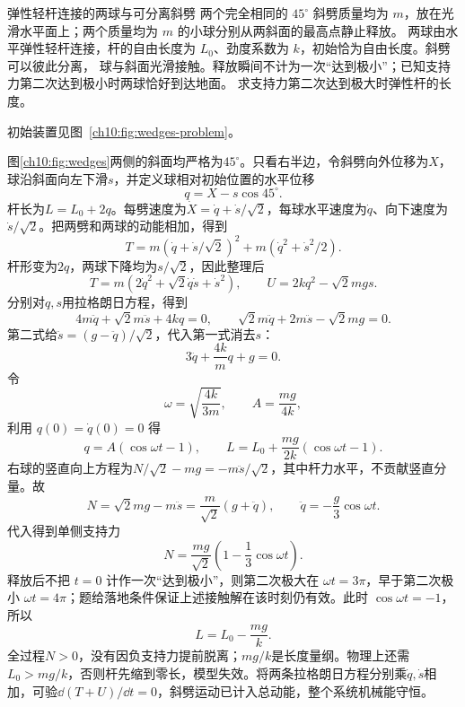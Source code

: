\begin{origexamplebox}{弹性轻杆连接的两球与可分离斜劈}\label{ch10:ex:wedges}
两个完全相同的 $45^\circ$ 斜劈质量均为 $m$，放在光滑水平面上；两个质量均为 $m$ 的小球分别从两斜面的最高点静止释放。
两球由水平弹性轻杆连接，杆的自由长度为 $L_0$、劲度系数为 $k$，初始恰为自由长度。斜劈可以彼此分离，
球与斜面光滑接触。释放瞬间不计为一次“达到极小”；已知支持力第二次达到极小时两球恰好到达地面。
求支持力第二次达到极大时弹性杆的长度。

初始装置见图~\ref{ch10:fig:wedges-problem}。
\chTenWedgeProblemFigure
\end{origexamplebox}
\begin{xesolution}
图\ref{ch10:fig:wedges}两侧的斜面均严格为$45^\circ$。只看右半边，令斜劈向外位移为$X$，球沿斜面向左下滑$s$，并定义球相对初始位置的水平位移
\[
 q=X-s\cos45^\circ.
\]
\chTenWedgeFigure
杆长为$L=L_0+2q$。每劈速度为$\dot X=\dot q+\dot s/\sqrt2$，每球水平速度为$\dot q$、向下速度为$\dot s/\sqrt2$。把两劈和两球的动能相加，得到
\[
 T=m(\dot q+\dot s/\sqrt2)^2+m(\dot q^2+\dot s^2/2).
\]
杆形变为$2q$，两球下降均为$s/\sqrt2$，因此整理后
\[
 T=m\left(2\dot q^2+\sqrt2\dot q\dot s+\dot s^2\right),\qquad
 U=2kq^2-\sqrt2mgs.
\]
分别对$q,s$用拉格朗日方程，得到
\[
 4m\ddot q+\sqrt2m\ddot s+4kq=0,\qquad
 \sqrt2m\ddot q+2m\ddot s-\sqrt2mg=0.
\]
第二式给$\ddot s=(g-\ddot q)/\sqrt2$，代入第一式消去$s$：
\[
 3\ddot q+\frac{4k}{m}q+g=0.
\]
令
\[
 \omega=\sqrt{\frac{4k}{3m}},\qquad A=\frac{mg}{4k},
\]
利用 $q(0)=\dot q(0)=0$ 得
\[
 q=A(\cos\omega t-1),\qquad
 L=L_0+\frac{mg}{2k}(\cos\omega t-1).
\]
右球的竖直向上方程为$N/\sqrt2-mg=-m\ddot s/\sqrt2$，其中杆力水平，不贡献竖直分量。故
\[
 N=\sqrt2mg-m\ddot s=\frac m{\sqrt2}(g+\ddot q),
 \qquad\ddot q=-\frac g3\cos\omega t.
\]
代入得到单侧支持力
\[
 N=\frac{mg}{\sqrt2}\left(1-\frac13\cos\omega t\right).
\]
释放后不把 $t=0$ 计作一次“达到极小”，则第二次极大在 $\omega t=3\pi$，早于第二次极小
$\omega t=4\pi$；题给落地条件保证上述接触解在该时刻仍有效。此时 $\cos\omega t=-1$，所以
\[
 \boxed{L=L_0-\frac{mg}{k}}.
\]
全过程$N>0$，没有因负支持力提前脱离；$mg/k$是长度量纲。物理上还需$L_0>mg/k$，否则杆先缩到零长，模型失效。将两条拉格朗日方程分别乘$\dot q,\dot s$相加，可验$\dd(T+U)/\dd t=0$，斜劈运动已计入总动能，整个系统机械能守恒。
\end{xesolution}

